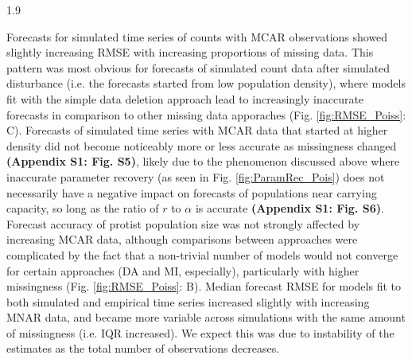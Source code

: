 \documentclass[12pt,english]{article} %
\begin{document}
\begin{linenumbers}
\begin{spacing}{1.9}
\begin{flushleft}
\hspace{1em} Forecasts for simulated time series of counts with MCAR observations showed  slightly increasing RMSE with increasing proportions of missing data. This pattern was most obvious for forecasts of simulated count data after simulated disturbance (i.e. the forecasts started from low population density), where models fit with the simple data deletion approach lead to increasingly inaccurate forecasts in comparison to other missing data apporaches (Fig. \ref{fig:RMSE_Poiss}: C). Forecasts of simulated time series with MCAR data that started at higher density did not become noticeably more or less accurate as missingness changed \textbf{(Appendix S1: Fig. S5)}, likely due to the phenomenon discussed above where inaccurate parameter recovery (as seen in Fig. \ref{fig:ParamRec_Pois}) does not necessarily have a negative impact on forecasts of populations near carrying capacity, so long as the ratio of $r$ to $\alpha$ is accurate \textbf{(Appendix S1: Fig. S6)}. Forecast accuracy of protist population size was not strongly affected by increasing MCAR data, although comparisons between approaches were complicated by the fact that a non-trivial number of models would not converge for certain approaches (DA and MI, especially), particularly with higher missingness (Fig. \ref{fig:RMSE_Poiss}: B). Median forecast RMSE for models fit to both simulated and empirical time series increased slightly with increasing MNAR data, and became more variable across simulations with the same amount of missingness (i.e. IQR increased). We expect this was due to instability of the estimates as the total number of observations decreases. 

\vspace{-2.5em}

\end{flushleft}
\end{spacing}
\end{linenumbers}
\end{document}
